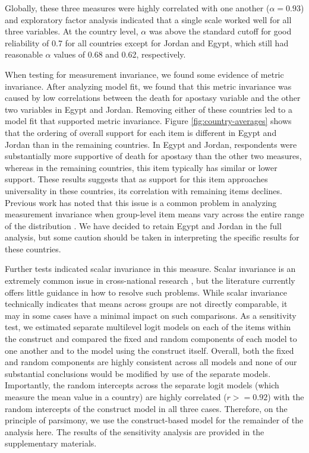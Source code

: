 \documentclass[10pt,letterpaper]{article}
\begin{document}
Globally, these three measures were highly correlated with one another (\(\alpha=0.93\)) and exploratory factor analysis indicated that a single scale worked well for all three variables. At the country level, \(\alpha\) was above the standard cutoff for good reliability of 0.7 for all countries except for Jordan and Egypt, which still had reasonable \(\alpha\) values of 0.68 and 0.62, respectively.

When testing for measurement invariance, we found some evidence of metric invariance. After analyzing model fit, we found that this metric invariance was caused by low correlations between the death for apostasy variable and the other two variables in Egypt and Jordan. Removing either of these countries led to a model fit that supported metric invariance. Figure \ref{fig:country-averages} shows that the ordering of overall support for each item is different in Egypt and Jordan than in the remaining countries. In Egypt and Jordan, respondents were substantially more supportive of death for apostasy than the other two measures, whereas in the remaining countries, this item typically has similar or lower support. These results suggests that as support for this item approaches universality in these countries, its correlation with remaining items declines.  Previous work has noted that this issue is a common problem in analyzing measurement invariance when group-level item means vary across the entire range of the distribution \cite{welzel_noninvariance_2021}. We have decided to retain Egypt and Jordan in the full analysis, but some caution should be taken in interpreting the specific results for these countries.

Further tests indicated scalar invariance in this measure. Scalar invariance is an extremely common issue in cross-national research \cite{meitinger_measurement_2020}, but the literature currently offers little guidance in how to resolve such problems. While scalar invariance technically indicates that means across groups are not directly comparable, it may in some cases have a minimal impact on such comparisons. As a sensitivity test, we estimated separate multilevel logit models on each of the items within the construct and compared the fixed and random components of each model to one another and to the model using the construct itself. Overall, both the fixed and random components are highly consistent across all models and none of our substantial conclusions would be modified by use of the separate models. Importantly, the random intercepts across the separate logit models (which measure the mean value in a country) are highly correlated (\(r>=0.92\)) with the random intercepts of the construct model in all three cases. Therefore, on the principle of parsimony, we use the construct-based model for the remainder of the analysis here. The results of the sensitivity analysis are provided in the supplementary materials.
\end{document}
